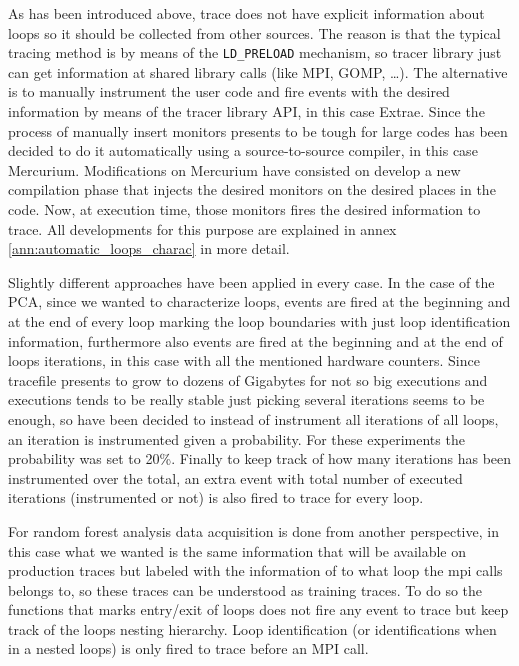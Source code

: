 As has been introduced above, trace does not have explicit information about 
loops so it should be collected from other sources. The reason is that the typical
tracing method is by means of the {\tt LD\_PRELOAD} mechanism, so tracer library just
can get information at shared library calls (like MPI, GOMP, \dots). The alternative
is to manually instrument the user code and fire events with the desired information
by means of the tracer library API, in this case Extrae. Since the process of
manually insert monitors presents to be tough for large codes has been decided
to do it automatically using a source-to-source compiler, in this case
Mercurium. Modifications on Mercurium have consisted on develop a new compilation 
phase that injects the desired monitors on the desired places in the code. 
Now, at execution time, those monitors  fires the desired information to trace. 
All developments for this purpose are explained in annex 
\ref{ann:automatic_loops_charac} in more detail.

Slightly different approaches have been applied in every case. In the case of
the PCA, since we wanted to characterize loops, events are
fired at the beginning and at the end of every loop marking the loop boundaries
with just loop identification information, furthermore also events are fired at 
the beginning and at the end of loops iterations, in this case with all the
mentioned hardware counters. Since tracefile presents to grow to dozens of
Gigabytes for not so big executions and executions tends to be really stable
just picking several iterations seems to be enough, so have been decided to 
instead of instrument all iterations of all loops, an iteration is instrumented 
given a probability. For these experiments the probability was set to 20\%.
Finally to keep track of how many iterations has been instrumented over the
total, an extra event with total number of executed iterations (instrumented or
not) is also fired to trace for every loop.

For random forest analysis data acquisition is done from another perspective, 
in this case what we wanted is the same information that will be available on
production traces but labeled with the information of to what loop the mpi calls belongs
to, so these traces can be understood as training traces. To do so the
functions that marks entry/exit of loops does not fire any event to trace but
keep track of the loops nesting hierarchy. Loop identification (or
identifications when in a nested loops) is only fired to trace before an MPI call. 

